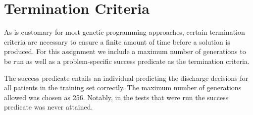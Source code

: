 \section{Termination Criteria}
As is customary for most genetic programming approaches, certain termination criteria are necessary to ensure a finite amount of time before a solution is produced. For this assignment we include a maximum number of generations to be run as well as a problem-specific success predicate as the termination criteria.

The success predicate entails an individual predicting the discharge decisions for all patients in the training set correctly. The maximum number of generations allowed was chosen as 256. Notably, in the tests that were run the success predicate was never attained.
